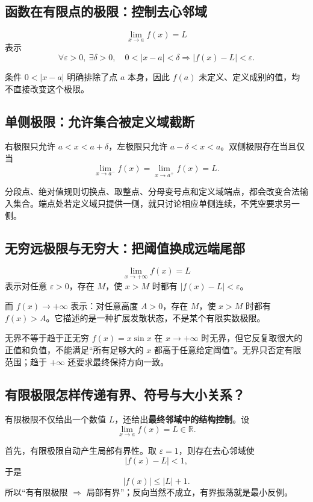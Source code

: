 \documentclass[11pt,a4paper]{ctexart}
\newcommand{\kw}[1]{\textbf{\color{deep}#1}}
\begin{document}
\subsection{函数在有限点的极限：控制去心邻域}

\[
\lim_{x\to a}f(x)=L
\]
表示
\[
\forall\varepsilon>0,\ \exists\delta>0,\quad
0<\lvert x-a\rvert<\delta\Longrightarrow \lvert f(x)-L\rvert<\varepsilon.
\]

条件 $0<\lvert x-a\rvert$ 明确排除了点 $a$ 本身，因此 $f(a)$ 未定义、定义成别的值，均不直接改变这个极限。

\subsection{单侧极限：允许集合被定义域截断}

右极限只允许 $a<x<a+\delta$，左极限只允许 $a-\delta<x<a$。双侧极限存在当且仅当
\[
\lim_{x\to a^-}f(x)=\lim_{x\to a^+}f(x)=L.
\]

分段点、绝对值规则切换点、取整点、分母变号点和定义域端点，都会改变合法输入集合。端点处若定义域只提供一侧，就只讨论相应单侧连续，不凭空要求另一侧。

\subsection{无穷远极限与无穷大：把阈值换成远端尾部}

\[
\lim_{x\to+\infty}f(x)=L
\]
表示对任意 $\varepsilon>0$，存在 $M$，使 $x>M$ 时都有 $\lvert f(x)-L\rvert<\varepsilon$。

而 $f(x)\to+\infty$ 表示：对任意高度 $A>0$，存在 $M$，使 $x>M$ 时都有 $f(x)>A$。它描述的是一种扩展发散状态，不是某个有限实数极限。

\begin{warnbox}{无界不等于趋于正无穷}
$f(x)=x\sin x$ 在 $x\to+\infty$ 时无界，但它反复取很大的正值和负值，不能满足“所有足够大的 $x$ 都高于任意给定阈值”。无界只否定有限范围；趋于 $+\infty$ 还要求最终保持方向一致。
\end{warnbox}

\subsection{有限极限怎样传递有界、符号与大小关系？}

有限极限不仅给出一个数值 $L$，还给出\kw{最终邻域中的结构控制}。设
\[
\lim_{x\to a}f(x)=L\in\mathbb R.
\]

首先，有限极限自动产生局部有界性。取 $\varepsilon=1$，则存在去心邻域使
\[
\lvert f(x)-L\rvert<1,
\]
于是
\[
\lvert f(x)\rvert\le \lvert L\rvert+1.
\]
所以“有有限极限 $\Rightarrow$ 局部有界”；反向当然不成立，有界振荡就是最小反例。
\end{document}
